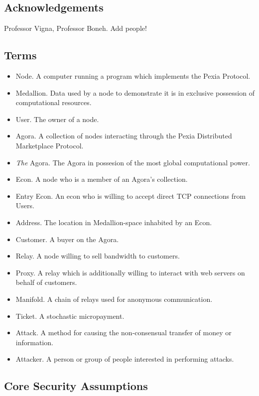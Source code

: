 \documentclass{article}
\newcommand{\mesh}{Pexia}
\begin{document}
\subsection{Acknowledgements}

Professor Vigna, Professor Boneh. Add people!

\subsection{Terms}

\begin{itemize}
    \item Node. A computer running a program which implements the \mesh{} Protocol.
    \item Medallion. Data used by a node to demonstrate it is in exclusive possession of computational resources.
    \item User. The owner of a node.
    \item Agora. A collection of nodes interacting through the \mesh{} Distributed Marketplace Protocol.
    \item \emph{The} Agora. The Agora in possesion of the most global computational power.
    \item Econ. A node who is a member of an Agora's collection.
    \item Entry Econ. An econ who is willing to accept direct TCP connections from Users.
    \item Address. The location in Medallion-space inhabited by an Econ.
    \item Customer. A buyer on the Agora.
    \item Relay. A node willing to sell bandwidth to customers.
    \item Proxy. A relay which is additionally willing to interact with web servers on behalf of customers.
    \item Manifold. A chain of relays used for anonymous communication.
    \item Ticket. A stochastic micropayment.
    \item Attack. A method for causing the non-consensual transfer of money or information.
    \item Attacker. A person or group of people interested in performing attacks.
\end{itemize}

\subsection{Core Security Assumptions}
\label{core-security}
\end{document}
